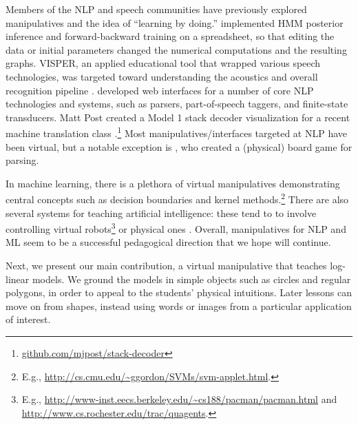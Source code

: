 \documentclass[11pt,letterpaper]{article}
\newcommand{\Note}[1]{}
\newcommand{\NoteSigned}[3]{{\sethlcolor{#2}\Note{#1: #3}}}
\newcommand{\NoteJE}[1]{\NoteSigned{JE}{LightGreen}{#1}}
\newcommand{\Commented}[1]{#1}
\begin{document}

Members of the NLP and speech communities have previously explored manipulatives and the idea of
``learning by doing.''
 implemented HMM posterior inference and
forward-backward training on a spreadsheet, so that editing the data or initial parameters
changed the numerical computations and the resulting graphs.  
VISPER, an applied educational tool that wrapped various speech technologies, 
was targeted toward understanding the acoustics and overall recognition pipeline 
\cite{nouza1997educational}. 
 developed web interfaces for a number of core NLP technologies and systems, such as parsers, part-of-speech 
taggers, and finite-state transducers.  Matt Post created a Model 1 stack decoder visualization for a recent machine translation class \cite{lopez2013learning}.\footnote{\url{github.com/mjpost/stack-decoder}}
Most manipulatives/interfaces targeted at NLP have been virtual, but a notable exception is , 
who created a (physical) board game for parsing. 

In machine learning, there is a plethora of virtual manipulatives demonstrating central concepts such 
as decision boundaries and kernel
methods.\footnote{E.g.,
  \url{http://cs.cmu.edu/~ggordon/SVMs/svm-applet.html}.
}
There are also several systems for teaching artificial intelligence: these tend to to involve controlling 
virtual robots\footnote{E.g., \url{http://www-inst.eecs.berkeley.edu/~cs188/pacman/pacman.html} and 
\url{http://www.cs.rochester.edu/trac/quagents}.}
or physical ones \cite{tokic2012robot}.
Overall, manipulatives for NLP and ML seem to be a successful
pedagogical direction that we hope will continue.

Next, we present our main contribution, a virtual manipulative that teaches log-linear models. We ground 
the models in simple objects such as circles and regular polygons, in order to appeal to the 
students' physical intuitions.  Later lessons can move on 
from shapes, instead using words or images from a particular
application of interest.
\end{document}
